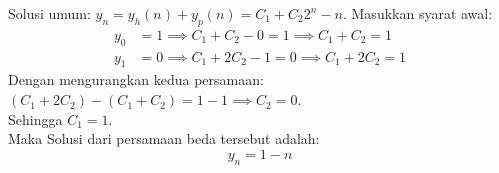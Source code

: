 \documentclass[11pt,letterpaper]{article}
\begin{document}
\begin{enumerate}
        Solusi umum: $y_n = y_h(n) + y_p(n) = C_1 + C_2 2^n - n$.
        Masukkan syarat awal:
        \begin{align*}
          y_0 & = 1 \implies C_1 + C_2 - 0 = 1 \implies C_1 + C_2 = 1   \\
          y_1 & = 0 \implies C_1 + 2C_2 - 1 = 0 \implies C_1 + 2C_2 = 1
        \end{align*}
        Dengan mengurangkan kedua persamaan: $(C_1+2C_2) - (C_1+C_2) = 1 - 1 \implies C_2 = 0$. \\
        Sehingga $C_1 = 1$. \\
        Maka Solusi dari persamaan beda tersebut adalah:
        \[ y_n = 1 - n \]
\end{enumerate}
\end{document}

